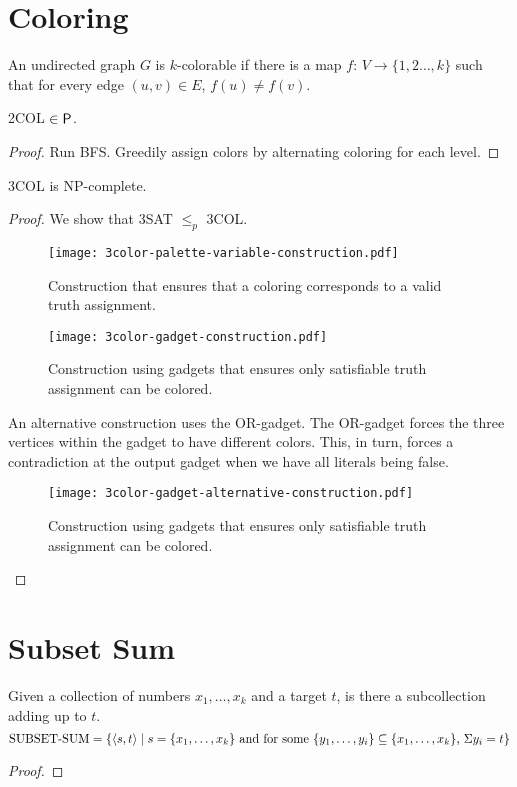 \section{Coloring}

An undirected graph $G$ is $k$-colorable if there is a map $f:\, V \to \{1,2\ldots,k\}$ such that for every edge $(u,v) \in E$, $f(u) \neq f(v)$.

\begin{theorem}
    2COL $\in \mathsf{P}$.
\end{theorem}

\begin{proof}
    Run BFS. Greedily assign colors by alternating coloring for each level.
\end{proof}

\begin{theorem}
    3COL is NP-complete.
\end{theorem}

\begin{proof}
    We show that 3SAT $\leq_p$ 3COL.

    \begin{figure}[htbp]
        \centering
        \texttt{[image: 3color-palette-variable-construction.pdf]}
        \caption{Construction that ensures that a coloring corresponds to a valid truth assignment.}
        \label{fig:3color-valid-construction}
    \end{figure}

    \begin{figure}[htbp]
        \centering
        \texttt{[image: 3color-gadget-construction.pdf]}
        \caption{Construction using gadgets that ensures only satisfiable truth assignment can be colored.}
        \label{fig:3color-gadgets-construction}
    \end{figure}

    An alternative construction uses the OR-gadget. The OR-gadget forces the three vertices within the gadget to have different colors. This, in turn, forces a contradiction at the output gadget when we have all literals being false.

    \begin{figure}[htbp]
        \centering
        \texttt{[image: 3color-gadget-alternative-construction.pdf]}
        \caption{Construction using gadgets that ensures only satisfiable truth assignment can be colored.}
        \label{fig:3color-gadgets-alternative-construction}
    \end{figure}
\end{proof}

\section{Subset Sum}

Given a collection of numbers $x_1,\ldots,x_k$ and a target $t$, is there a subcollection adding up to $t$.
$$
\text{SUBSET-SUM} = \{\langle s,t \rangle \mid \text{$s = \{x_1,\ldots,x_k\}$ and for some $\{y_1,\ldots,y_i\} \subseteq \{x_1,\ldots,x_k\}$, $\Sigma y_i = t$}\}
$$

\begin{proof}
    
\end{proof}